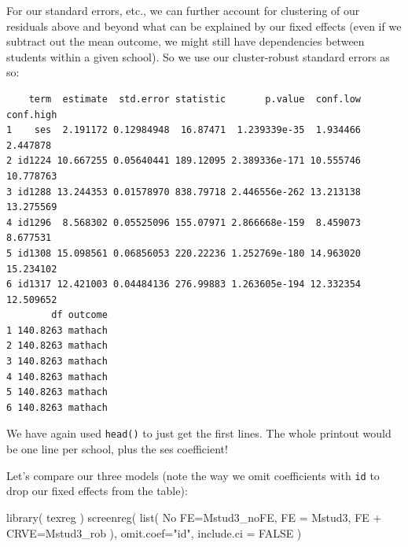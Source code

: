 \documentclass[
  letterpaper,
  DIV=11,
  numbers=noendperiod]{scrreprt}
\newenvironment{Shaded}{}{}
\newcommand{\AttributeTok}[1]{\textcolor[rgb]{0.49,0.56,0.16}{#1}}
\newcommand{\ConstantTok}[1]{\textcolor[rgb]{0.53,0.00,0.00}{#1}}
\newcommand{\DecValTok}[1]{\textcolor[rgb]{0.25,0.63,0.44}{#1}}
\newcommand{\FunctionTok}[1]{\textcolor[rgb]{0.02,0.16,0.49}{#1}}
\newcommand{\NormalTok}[1]{#1}
\newcommand{\OtherTok}[1]{\textcolor[rgb]{0.00,0.44,0.13}{#1}}
\newcommand{\SpecialCharTok}[1]{\textcolor[rgb]{0.25,0.44,0.63}{#1}}
\newcommand{\StringTok}[1]{\textcolor[rgb]{0.25,0.44,0.63}{#1}}
\begin{document}
For our standard errors, etc., we can further account for clustering of
our residuals above and beyond what can be explained by our fixed
effects (even if we subtract out the mean outcome, we might still have
dependencies between students within a given school). So we use our
cluster-robust standard errors as so:

\begin{Shaded}
\end{Shaded}

\begin{verbatim}
    term  estimate  std.error statistic       p.value  conf.low conf.high
1    ses  2.191172 0.12984948  16.87471  1.239339e-35  1.934466  2.447878
2 id1224 10.667255 0.05640441 189.12095 2.389336e-171 10.555746 10.778763
3 id1288 13.244353 0.01578970 838.79718 2.446556e-262 13.213138 13.275569
4 id1296  8.568302 0.05525096 155.07971 2.866668e-159  8.459073  8.677531
5 id1308 15.098561 0.06856053 220.22236 1.252769e-180 14.963020 15.234102
6 id1317 12.421003 0.04484136 276.99883 1.263605e-194 12.332354 12.509652
        df outcome
1 140.8263 mathach
2 140.8263 mathach
3 140.8263 mathach
4 140.8263 mathach
5 140.8263 mathach
6 140.8263 mathach
\end{verbatim}

We have again used \texttt{head()} to just get the first lines. The
whole printout would be one line per school, plus the ses coefficient!

Let's compare our three models (note the way we omit coefficients with
\texttt{id} to drop our fixed effects from the table):

\begin{Shaded}
\begin{Highlighting}[]
\FunctionTok{library}\NormalTok{( texreg )}
\FunctionTok{screenreg}\NormalTok{( }\FunctionTok{list}\NormalTok{( }\StringTok{\textasciigrave{}}\AttributeTok{No FE}\StringTok{\textasciigrave{}}\OtherTok{=}\NormalTok{Mstud3\_noFE, }\StringTok{\textasciigrave{}}\AttributeTok{FE}\StringTok{\textasciigrave{}} \OtherTok{=}\NormalTok{ Mstud3, }\StringTok{\textasciigrave{}}\AttributeTok{FE + CRVE}\StringTok{\textasciigrave{}}\OtherTok{=}\NormalTok{Mstud3\_rob ), }
           \AttributeTok{omit.coef=}\StringTok{"id"}\NormalTok{,}
           \AttributeTok{include.ci =} \ConstantTok{FALSE}\NormalTok{ )}
\end{Highlighting}
\end{Shaded}
\end{document}
